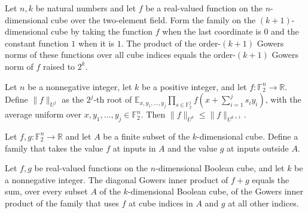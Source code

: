 \begin{theorem}
\label{FABL.prod_gowersNorm_monotonicityFamily}
\leanok
{}
Let $n,k$ be natural numbers and let $f$ be a real-valued function on the
$n$-dimensional cube over the two-element field. Form the family on the
$(k+1)$-dimensional cube by taking the function $f$ when the last coordinate is $0$ and
the constant function $1$ when it is $1$. The product of the order-$(k+1)$ Gowers norms
of these functions over all cube indices equals the order-$(k+1)$ Gowers norm of $f$
raised to $2^k$.
\end{theorem}

\begin{theorem}
\label{FABL.gowersNorm_mono}
\leanok
{}
Let $n$ be a nonnegative integer, let $k$ be a positive integer, and let $f\colon\mathbb
F_2^n\to\mathbb R$. Define $\|f\|_{U^j}$ as the $2^j$-th root of $\mathbb
E_{x,y_1,\ldots,y_j}\prod_{s\in\mathbb F_2^j}f(x+\sum_{i=1}^j s_i y_i)$, with the
average uniform over $x,y_1,\ldots,y_j\in\mathbb F_2^n$. Then
$\|f\|_{U^k}\leq\|f\|_{U^{k+1}}$.
\end{theorem}

\begin{definition}
\label{FABL.gowersChoiceFamily}
\leanok
{}
Let $f,g:\mathbb F_2^n\to\mathbb R$ and let $A$ be a finite subset of the
$k$-dimensional cube. Define a family that takes the value $f$ at inputs in $A$ and the
value $g$ at inputs outside $A$.
\end{definition}

\begin{theorem}
\label{FABL.gowersDiagonalInner_add_expansion}
\leanok
{}
Let $f,g$ be real-valued functions on the $n$-dimensional Boolean cube, and let $k$ be a
nonnegative integer. The diagonal Gowers inner product of $f+g$ equals the sum, over
every subset $A$ of the $k$-dimensional Boolean cube, of the Gowers inner product of the
family that uses $f$ at cube indices in $A$ and $g$ at all other indices.
\end{theorem}

